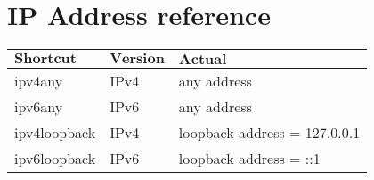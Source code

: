 \newpage
\section{IP Address reference}
\label{sec:ipref}


\begin{tabular}{|p{75pt}|p{75pt}|p{200pt}|}
\hline
$\textbf{Shortcut}$ & $\textbf{Version}$ & $\textbf{Actual}$ \\ 
\hline
ipv4any & IPv4 & any address \\
\hline
ipv6any & IPv6 & any address \\
\hline
ipv4loopback & IPv4 & loopback address = 127.0.0.1 \\
\hline
ipv6loopback & IPv6 & loopback address = ::1 \\
\hline
\end{tabular}

\newpage
